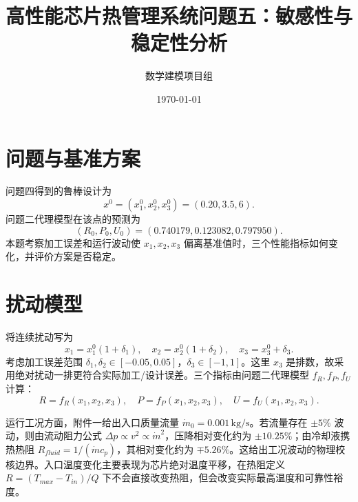 \documentclass[UTF8,a4paper,12pt]{ctexart}
\title{高性能芯片热管理系统问题五：敏感性与稳定性分析}
\author{数学建模项目组}\date{\today}
\begin{document}
\maketitle

\section{问题与基准方案}
问题四得到的鲁棒设计为
\[
x^0=(x_1^0,x_2^0,x_3^0)=(0.20,3.5,6).
\]
问题二代理模型在该点的预测为
\[
(R_0,P_0,U_0)=(0.740179,0.123082,0.797950).
\]
本题考察加工误差和运行波动使 $x_1,x_2,x_3$ 偏离基准值时，三个性能指标如何变化，并评价方案是否稳定。

\section{扰动模型}
将连续扰动写为
\[
x_1=x_1^0(1+\delta_1),\quad x_2=x_2^0(1+\delta_2),\quad x_3=x_3^0+\delta_3.
\]
考虑加工误差范围 $\delta_1,\delta_2\in[-0.05,0.05]$，$\delta_3\in[-1,1]$。这里 $x_3$ 是排数，故采用绝对扰动一排更符合实际加工/设计误差。三个指标由问题二代理模型 $f_R,f_P,f_U$ 计算：
\[
R=f_R(x_1,x_2,x_3),\quad P=f_P(x_1,x_2,x_3),\quad U=f_U(x_1,x_2,x_3).
\]

运行工况方面，附件一给出入口质量流量 $\dot m_0=0.001\,\mathrm{kg/s}$。若流量存在 $\pm5\%$ 波动，则由流动阻力公式 $\Delta p\propto v^2\propto\dot m^2$，压降相对变化约为 $\pm10.25\%$；由冷却液携热热阻 $R_{fluid}=1/(\dot m c_p)$，其相对变化约为 $\mp5.26\%$。这给出工况波动的物理校核边界。入口温度变化主要表现为芯片绝对温度平移，在热阻定义 $R=(T_{max}-T_{in})/Q$ 下不会直接改变热阻，但会改变实际最高温度和可靠性裕度。
\end{document}
